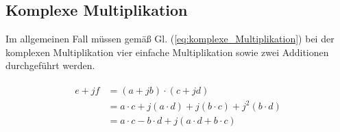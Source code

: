 \subsection{Komplexe Multiplikation}\label{sec:komplexe_Multiplikation}

Im allgemeinen Fall müssen gemäß Gl. (\ref{eq:komplexe_Multiplikation}) bei der komplexen Multiplikation vier einfache Multiplikation sowie zwei Additionen durchgeführt werden.


\begin{align}\label{eq:komplexe_Multiplikation}
\begin{split}
 e + jf &= (a + jb) \cdot (c + jd)\\
        &= a \cdot c + j(a \cdot d) + j(b \cdot c) + j^2(b \cdot d)\\
        &= a \cdot c - b \cdot d + j(a \cdot d + b \cdot c)
\end{split}
  \end{align}



